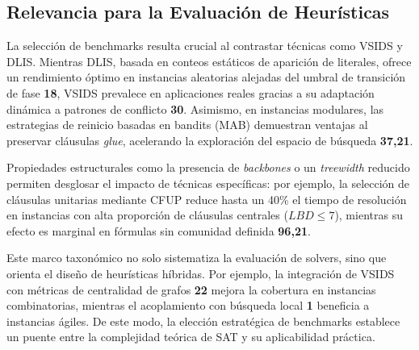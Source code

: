 \subsection{Relevancia para la Evaluación de Heurísticas}
La selección de benchmarks resulta crucial al contrastar técnicas como VSIDS y DLIS. Mientras DLIS, basada en conteos estáticos de aparición de literales, ofrece un rendimiento óptimo en instancias aleatorias alejadas del umbral de transición de fase \textbf{18}, VSIDS prevalece en aplicaciones reales gracias a su adaptación dinámica a patrones de conflicto \textbf{30}. Asimismo, en instancias modulares, las estrategias de reinicio basadas en bandits (MAB) demuestran ventajas al preservar cláusulas \textit{glue}, acelerando la exploración del espacio de búsqueda \textbf{37,21}.

Propiedades estructurales como la presencia de \textit{backbones} o un \textit{treewidth} reducido permiten desglosar el impacto de técnicas específicas: por ejemplo, la selección de cláusulas unitarias mediante CFUP reduce hasta un 40\% el tiempo de resolución en instancias con alta proporción de cláusulas centrales ($LBD\le7$), mientras su efecto es marginal en fórmulas sin comunidad definida \textbf{96,21}.

Este marco taxonómico no solo sistematiza la evaluación de solvers, sino que orienta el diseño de heurísticas híbridas. Por ejemplo, la integración de VSIDS con métricas de centralidad de grafos \textbf{22} mejora la cobertura en instancias combinatorias, mientras el acoplamiento con búsqueda local \textbf{1} beneficia a instancias ágiles. De este modo, la elección estratégica de benchmarks establece un puente entre la complejidad teórica de SAT y su aplicabilidad práctica.


